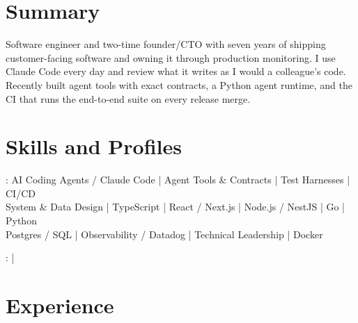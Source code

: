 \documentclass[print]{jack-resume}
\begin{document}
\pagecolor{darkmodeBackground}


\begin{minipage}[t][1cm][t]{.03\textwidth}
    \hfill
\end{minipage}

\section{Summary}
Software engineer and two-time founder/CTO with seven years of shipping customer-facing software and owning it through production monitoring. I use Claude Code every day and review what it writes as I would a colleague's code. Recently built agent tools with exact contracts, a Python agent runtime, and the CI that runs the end-to-end suite on every release merge.
\sectionsep

\section{Skills and Profiles}
:
AI Coding Agents / Claude Code \hfill | \hfill
Agent Tools \& Contracts \hfill | \hfill
Test Harnesses \hfill | \hfill
CI/CD \\
\hspace{1.0cm} System \& Data Design \hfill | \hfill
TypeScript \hfill | \hfill
React / Next.js \hfill | \hfill
Node.js / NestJS \hfill | \hfill
Go \hfill | \hfill
Python \\
\hspace{1.0cm} Postgres / SQL \hfill | \hfill
Observability / Datadog \hfill | \hfill
Technical Leadership \hfill | \hfill
Docker \\

\raggedright{
    :
      \href{https://www.linkedin.com/in/jack-sturtevant/}{ \ExternalLink} |
     \href{https://github.com/jacksturt}{ \ExternalLink}}

\section{Experience}
\end{document}
